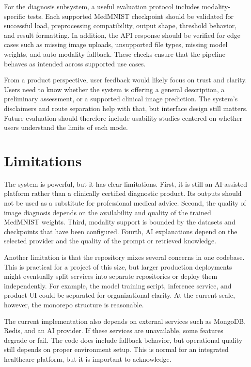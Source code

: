 \documentclass[conference]{IEEEtran}
\begin{document}
For the diagnosis subsystem, a useful evaluation protocol includes modality-specific tests. Each supported MedMNIST checkpoint should be validated for successful load, preprocessing compatibility, output shape, threshold behavior, and result formatting. In addition, the API response should be verified for edge cases such as missing image uploads, unsupported file types, missing model weights, and auto modality fallback. These checks ensure that the pipeline behaves as intended across supported use cases.

From a product perspective, user feedback would likely focus on trust and clarity. Users need to know whether the system is offering a general description, a preliminary assessment, or a supported clinical image prediction. The system’s disclaimers and route separation help with that, but interface design still matters. Future evaluation should therefore include usability studies centered on whether users understand the limits of each mode.

\section{Limitations}
The system is powerful, but it has clear limitations. First, it is still an AI-assisted platform rather than a clinically certified diagnostic product. Its outputs should not be used as a substitute for professional medical advice. Second, the quality of image diagnosis depends on the availability and quality of the trained MedMNIST weights. Third, modality support is bounded by the datasets and checkpoints that have been configured. Fourth, AI explanations depend on the selected provider and the quality of the prompt or retrieved knowledge.

Another limitation is that the repository mixes several concerns in one codebase. This is practical for a project of this size, but larger production deployments might eventually split services into separate repositories or deploy them independently. For example, the model training script, inference service, and product UI could be separated for organizational clarity. At the current scale, however, the monorepo structure is reasonable.

The current implementation also depends on external services such as MongoDB, Redis, and an AI provider. If these services are unavailable, some features degrade or fail. The code does include fallback behavior, but operational quality still depends on proper environment setup. This is normal for an integrated healthcare platform, but it is important to acknowledge.
\end{document}
